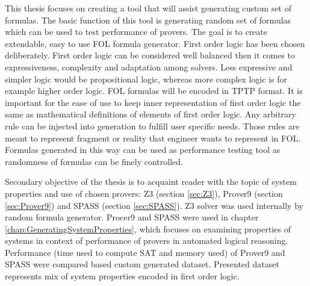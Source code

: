 This thesis focuses on creating a tool that will assist generating custom set of formulas. The basic function of this tool is generating random set of formulas which can be used to test performance of provers. The goal is to create extendable, easy to use \gls{FOL} formula generator. First order logic has been chosen deliberately. First order logic can be considered well balanced then it comes to expressiveness, complexity and adaptation among solvers. Less expressive and simpler logic would be propositional logic, whereas more complex logic is for example higher order logic. \gls{FOL} formulas will be encoded in \gls{TPTP} format. It is important for the ease of use to keep inner representation of first order logic the same as mathematical definitions of elements of first order logic. Any arbitrary rule can be injected into generation to fulfill user specific needs. Those rules are meant to represent fragment or reality that engineer wants to represent in \gls{FOL}. Formulas generated in this way can be used as performance testing tool as randomness of formulas can be finely controlled. 

Secondary objective of the thesis is to acquaint reader with the topic of system properties and use of chosen provers: Z3 (section \ref{sec:Z3}), Prover9 (section \ref{sec:Prover9}) and SPASS (section \ref{sec:SPASS}).
Z3 solver was used internally by random formula generator.
Procer9 and SPASS were used in chapter \ref{chap:GeneratingSystemProperties}, which focuses on examining properties of systems in context of performance of provers in automated logical reasoning.
Performance (time used to compute SAT and memory used) of Prover9 and SPASS were compared based custom generated dataset.
Presented dataset represents mix of system properties encoded in first order logic.



